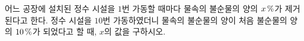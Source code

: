 어느 공장에 설치된 정수 시설을 $1$번 가동할 때마다 물속의 불순물의 양의 $x\mkern3mu \%$가 제거된다고 한다. 정수 시설을 $10$번 가동하였더니 물속의 불순물의 양이 처음 불순물의 양의 $10\mkern3mu \%$가 되었다고 할 때, $x$의 값을 구하시오. 
